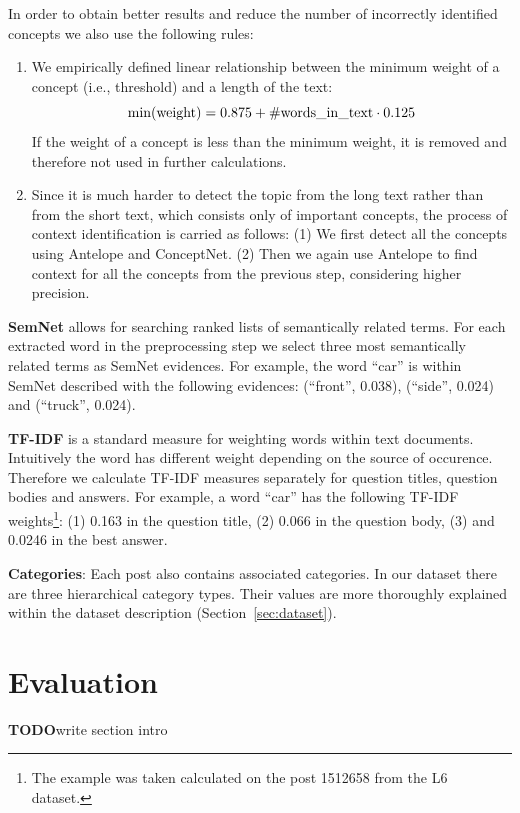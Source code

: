 \documentclass[conference]{IEEEtran}
\newcommand{\secref}[1]{Section~\ref{#1}}
\newcommand{\TODO}[0]{{\color{BrickRed}\textbf{TODO}}}
\begin{document}
In order to obtain better results and reduce the number of incorrectly identified concepts we also use the following rules:
\begin{enumerate}
	\item We empirically defined linear relationship between the minimum weight of a concept (i.e., threshold) and a length of the text:
$$
	{\rm min(weight)} = 0.875 + {\rm \#words\_in\_text} \cdot 0.125
$$
If the weight of a concept is less than the minimum weight, it is removed and therefore not used in further calculations.
	\item Since it is much harder to detect the topic from the long text rather than from the short text, which consists only of important concepts, the process of context identification is carried as follows: (1) We first detect all the concepts using Antelope and ConceptNet. (2) Then we again use Antelope to find context for all the concepts from the previous step, considering higher precision.
\end{enumerate}

{\bf SemNet} allows for searching ranked lists of semantically related terms. For each extracted word in the preprocessing step we select three most semantically related terms as SemNet evidences. For example, the word ``car'' is within SemNet described with the following evidences: (``front'', 0.038), (``side'', 0.024) and (``truck'', 0.024).

{\bf TF-IDF} is a standard measure for weighting words within text documents. Intuitively the word has different weight depending on the source of occurence. Therefore we calculate TF-IDF measures separately for question titles, question bodies and answers. For example, a word ``car'' has the following TF-IDF weights\footnote{The example was taken calculated on the post 1512658 from the L6 dataset.}: (1) 0.163 in the question title, (2) 0.066 in the question body, (3) and 0.0246 in the best answer. 

{\bf Categories}:
Each post also contains associated categories. In our dataset there are three hierarchical category types. Their values are more thoroughly explained within the dataset description (\secref{sec:dataset}).


\section{Evaluation}
\TODO write section intro
\end{document}
